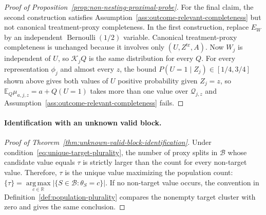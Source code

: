 \begin{proof}[Proof of Proposition~\ref{prop:non-nesting-proximal-probe}]
For the final claim, the second construction satisfies Assumption~\ref{ass:outcome-relevant-completeness} but not canonical treatment-proxy completeness. In the first construction, replace $E_W$ by an independent $\operatorname{Bernoulli}(1/2)$ variable. Canonical treatment-proxy completeness is unchanged because it involves only $(U,Z^{\mathrm{tr}},A)$. Now $W_j$ is independent of $U$, so $\mathcal K_jQ$ is the same distribution for every $Q$. For every representation $\phi_j$ and almost every $z$, the bound $P(U=1\mid Z_j)\in[1/4,3/4]$ shown above gives both values of $U$ positive probability given $Z_j=z$, so $\mathbb E_Q\mu_{a,j,z}=a+Q(U=1)$ takes more than one value over $\mathcal Q_{j,z}$ and Assumption~\ref{ass:outcome-relevant-completeness} fails.
\end{proof}

\paragraph{Identification with an unknown valid block.}
\begin{proof}[Proof of Theorem~\ref{thm:unknown-valid-block-identification}]
Under condition~\eqref{eq:unique-target-plurality}, the number of proxy splits in $\mathcal B$ whose candidate value equals $\tau$ is strictly larger than the count for every non-target value. Therefore, $\tau$ is the unique value maximizing the population count:
\(\{\tau\} = \underset{c\in\mathbb R}{\operatorname{arg\,max}} \bigl|\{S\in\mathcal B:\theta_S=c\}\bigr|.\)
If no non-target value occurs, the convention in Definition~\ref{def:population-plurality} compares the nonempty target cluster with zero and gives the same conclusion.
\end{proof}

